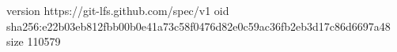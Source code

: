 version https://git-lfs.github.com/spec/v1
oid sha256:e22b03eb812fbb00b0e41a73c58f0476d82e0c59ac36fb2eb3d17c86d6697a48
size 110579
